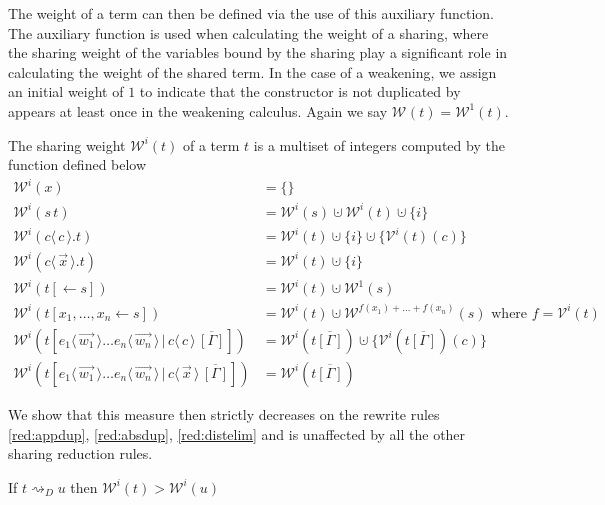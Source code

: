 \documentclass[a4paper,UKenglish,cleveref, autoref]{lipics-v2019}
\newcommand{\set}[1]{ \{ #1 \} }
\newcommand{\app}[2]{#1 \, #2}
\newcommand{\fake}[3]{#1 \langle \, #2 \, \rangle . #3}
\newcommand{\share}[3]{#1 [#2 \leftarrow #3]}
\newcommand{\dist}[5]{#1 [ #2 \, \vert \, \fakedist{#4}{#5} \, #3 ]}
\newcommand{\fakedist}[2]{#1 \langle \, #2 \, \rangle}
\newcommand{\weight}[2]{\mathcal{W}^{#1}(#2)}
\newcommand{\weightvar}[2]{\mathcal{V}^{#1}(#2)}
\begin{document}
\noindent The weight of a term can then be defined via the use of this auxiliary function. The auxiliary function is used when calculating the weight of a sharing, where the sharing weight of the variables bound by the sharing play a significant role in calculating the weight of the shared term. In the case of a weakening, we assign an initial weight of $1$ to indicate that the constructor is not duplicated by appears at least once in the weakening calculus. Again we say $\weight{}{t} = \weight{1}{t}$.

\begin{definition}
The sharing weight $\weight{i}{t}$ of a term $t$ is a multiset of integers computed by the function defined below
\begin{align*}
	\weight{i}{x} &= \set{} \\
	\weight{i}{\app{s}{t}} &= \weight{i}{s} \cupdot \weight{i}{t} \cupdot \set{i}\\
	\weight{i}{\fake{c}{c}{t}} &= \weight{i}{t} \cupdot \set{i} \cupdot \set{\weightvar{i}{t}(c)} \\
	\weight{i}{\fake{c}{\vec{x}}{t}} &= \weight{i}{t} \cupdot \set{i} \\
	\weight{i}{\share{t}{}{s}} &= \weight{i}{t} \cupdot \weight{1}{s} \\
	\weight{i}{\share{t}{x_{1}, \dots, x_{n}}{s}} &= \weight{i}{t} \cupdot \weight{f(x_{1}) + \dots + f(x_{n})}{s} \text{ where } f = \weightvar{i}{t} \\
	\weight{i}{\dist{t}{\fakedist{e_{1}}{\vec{w_{1}}} \dots \fakedist{e_{n}}{\vec{w_{n}}}}{\overline{[\Gamma]}}{c}{c}} &= \weight{i}{t\overline{[\Gamma]}} \cupdot \set{\weightvar{i}{t\overline{[\Gamma]}} (c)} \\ %
	\weight{i}{\dist{t}{\fakedist{e_{1}}{\vec{w_{1}}} \dots \fakedist{e_{n}}{\vec{w_{n}}}}{\overline{[\Gamma]}}{c}{\vec{x}}} &= \weight{i}{t\overline{[\Gamma]}}
\end{align*}
\end{definition}

\noindent We show that this measure then strictly decreases on the rewrite rules \ref{red:appdup}, \ref{red:absdup}, \ref{red:distelim} and is unaffected by all the other sharing reduction rules.

\begin{lemma}
\label{theo:decreaseweight}
If $t \rightsquigarrow_{D} u$ then $\weight{i}{t} > \weight{i}{u}$
\end{lemma}
\end{document}
